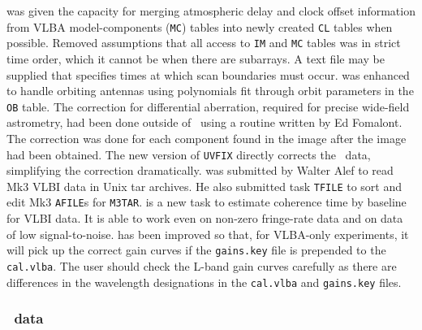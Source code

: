 \begin{description}
 was given the capacity for merging atmospheric delay
   and clock offset information from VLBA model-components ({\tt MC})
   tables into newly created {\tt CL} tables when possible.  Removed
   assumptions that all access to {\tt IM} and {\tt MC} tables was in
   strict time order, which it cannot be when there are subarrays.
   A text file may be supplied that specifies times at which scan
   boundaries must occur.
 was enhanced to handle orbiting antennas using
   polynomials fit through orbit parameters in the {\tt OB} table.
   The correction for differential aberration, required for precise
   wide-field astrometry, had been done outside of \AIPS\ using a
   routine written by Ed Fomalont.  The correction was done for each
   component found in the image after the image had been obtained.
   The new version of {\tt UVFIX} directly corrects the \uv\ data,
   simplifying the correction dramatically.
 was submitted by Walter Alef to read Mk3 VLBI data in
   Unix tar archives.  He also submitted task {\tt TFILE} to sort and
   edit Mk3 {\tt AFILE}s for \hbox{{\tt M3TAR}}.
 is a new task to estimate coherence time by baseline
   for VLBI data.  It is able to work even on non-zero fringe-rate
   data and on data of low signal-to-noise.
 has been improved so that, for VLBA-only experiments, it
   will pick up the correct gain curves if the {\tt gains.key} file is
   prepended to the {\tt cal.vlba}.  The user should check the L-band
   gain curves carefully as there are differences in the wavelength
   designations in the {\tt cal.vlba} and {\tt gains.key} files.
\end{description}

\subsubsection{\UV\ data}


